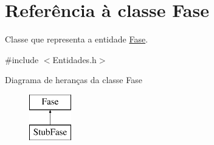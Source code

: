 \hypertarget{class_fase}{
\section{\-Referência à classe \-Fase}
\label{class_fase}
}


\-Classe que representa a entidade \hyperlink{class_fase}{\-Fase}.  




{\ttfamily \#include $<$\-Entidades.\-h$>$}

\-Diagrama de heranças da classe \-Fase\begin{figure}[H]
\begin{center}
\leavevmode
\includegraphics[height=2.000000cm]{class_fase}
\end{center}
\end{figure}

